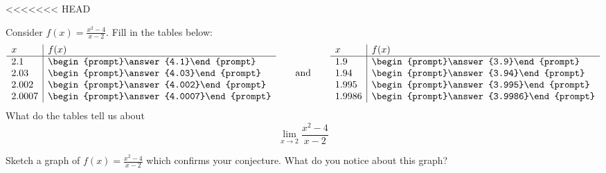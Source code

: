 \documentclass[handout]{ximera}
\begin{document}
<<<<<<< HEAD
\begin{question}
	Consider $f(x) = \frac{x^2-4}{x-2}$. Fill in the 
	tables below:
	\[
	\begin{array}{l|l}
	x      & f(x)      \\ \hline
	2.1    & \begin{prompt}\answer{4.1}\end{prompt}\\
	2.03   & \begin{prompt}\answer{4.03}\end{prompt}\\
	2.002  & \begin{prompt}\answer{4.002}\end{prompt}\\
	2.0007 & \begin{prompt}\answer{4.0007}\end{prompt} 
	\end{array}
	\qquad\text{and}\qquad
	\begin{array}{l|l}
	x      & f(x)            \\ \hline
	1.9    &  \begin{prompt}\answer{3.9}\end{prompt} \\
	1.94   &  \begin{prompt}\answer{3.94}\end{prompt} \\
	1.995  &  \begin{prompt}\answer{3.995}\end{prompt} \\
	1.9986 &  \begin{prompt}\answer{3.9986}\end{prompt}
	\end{array}
	\]
	What do the tables tell us about
	\[
	\lim_{x\to 2} \frac{x^2-4}{x-2}
	\]
	
	Sketch a graph of $f(x) = \frac{x^2-4}{x-2}$ which confirms your conjecture.   What do you notice about this graph?
	 
	\newpage

\end{question}
\end{document}
